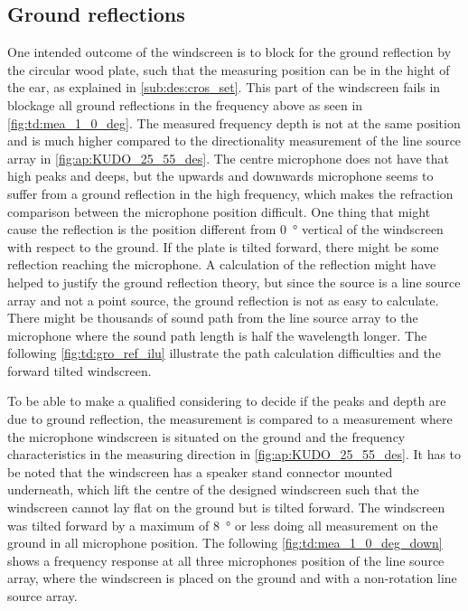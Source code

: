\subsection{Ground reflections}\label{sec:des:ground_reflection}
One intended outcome of the windscreen is to block for the ground reflection by the circular wood plate, such that the measuring position can be in the hight of the ear, as explained in \autoref{sub:des:cros_set}. This part of the windscreen fails in blockage all ground reflections in the frequency above  as seen in \autoref{fig:td:mea_1_0_deg}. The measured frequency depth is not at the same position and is much higher compared to the directionality measurement of the line source array in \autoref{fig:ap:KUDO_25_55_des}. The centre microphone does not have that high peaks and deeps, but the upwards and downwards microphone seems to suffer from a ground reflection in the high frequency, which makes the refraction comparison between the microphone position difficult. One thing that might cause the reflection is the position different from \SI{0}{\degree} vertical of the windscreen with respect to the ground. If the plate is tilted forward, there might be some reflection reaching the microphone. A calculation of the reflection might have helped to justify the ground reflection theory, but since the source is a line source array and not a point source, the ground reflection is not as easy to calculate. There might be thousands of sound path from the line source array to the microphone where the sound path length is half the wavelength longer. The following \autoref{fig:td:gro_ref_ilu} illustrate the path calculation difficulties and the forward tilted windscreen. 



To be able to make a qualified considering to decide if the peaks and depth are due to ground reflection, the measurement is compared to a measurement where the microphone windscreen is situated on the ground and the frequency characteristics in the measuring direction in \autoref{fig:ap:KUDO_25_55_des}.  It has to be noted that the windscreen has a speaker stand connector mounted underneath, which lift the centre of the designed windscreen such that the windscreen cannot lay flat on the ground but is tilted forward. The windscreen was tilted forward by a maximum of \SI{8}{\degree} or less doing all measurement on the ground in all microphone position. The following \autoref{fig:td:mea_1_0_deg_down} shows a frequency response at all three microphones position of the line source array, where the windscreen is placed on the ground and with a non-rotation line source array.


